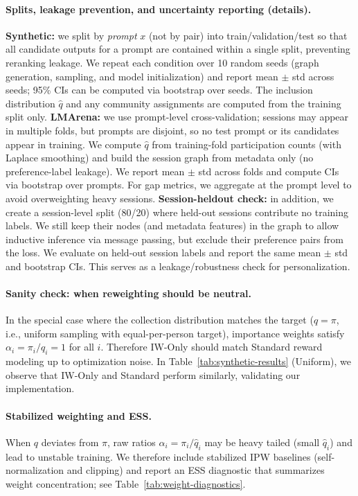 \documentclass{article}
\theoremstyle{plain}
\theoremstyle{definition}
\theoremstyle{remark}
\begin{document}
\paragraph{Splits, leakage prevention, and uncertainty reporting (details).}
\textbf{Synthetic:} we split by \emph{prompt} $x$ (not by pair) into
train/validation/test so that all candidate outputs for a prompt are contained
within a single split, preventing reranking leakage. We repeat each condition
over 10 random seeds (graph generation, sampling, and model initialization) and
report mean $\pm$ std across seeds; 95\% CIs can be computed via bootstrap over
seeds. The inclusion distribution $\hat q$ and any community assignments are
computed from the training split only. \textbf{LMArena:} we use prompt-level
cross-validation; sessions may appear in multiple folds, but prompts are
disjoint, so no test prompt or its candidates appear in training. We compute
$\hat q$ from training-fold participation counts (with Laplace smoothing) and
build the session graph from metadata only (no preference-label leakage).
We report mean $\pm$ std across folds and compute CIs via bootstrap over prompts.
For gap metrics, we aggregate at the prompt level to avoid overweighting heavy
sessions.
\textbf{Session-heldout check:} in addition, we create a session-level split
(80/20) where held-out sessions contribute no training labels. We still
keep their nodes (and metadata features) in the graph to allow inductive
inference via message passing, but exclude their preference pairs from the loss.
We evaluate on held-out session labels and report the same mean $\pm$ std and
bootstrap CIs. This serves as a leakage/robustness check for personalization.

\paragraph{Sanity check: when reweighting should be neutral.}
In the special case where the collection distribution matches the target
($q=\pi$, i.e., uniform sampling with equal-per-person target), importance
weights satisfy $\alpha_i=\pi_i/q_i=1$ for all $i$. Therefore IW-Only should
match Standard reward modeling up to optimization noise. In
Table~\ref{tab:synthetic-results} (Uniform), we observe that IW-Only and
Standard perform similarly, validating our implementation.

\paragraph{Stabilized weighting and ESS.}
When $q$ deviates from $\pi$, raw ratios $\alpha_i=\pi_i/\hat q_i$ may be heavy
tailed (small $\hat q_i$) and lead to unstable training. We therefore include
stabilized IPW baselines (self-normalization and clipping) and report an ESS
diagnostic that summarizes weight concentration; see
Table~\ref{tab:weight-diagnostics}.
\end{document}

